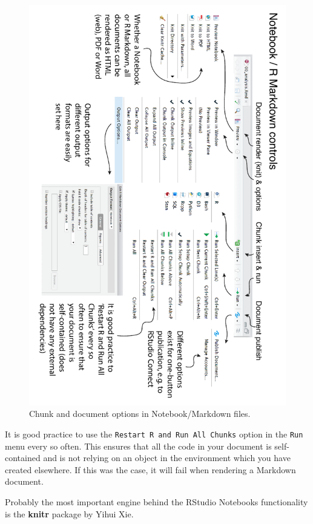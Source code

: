 \documentclass[
  12pt,
  krantz2]{krantz}
\begin{document}
\begin{figure}
\centering
\includegraphics{images/chapter12/4_notebook_options_rotated.pdf}
\caption{\label{fig:chap12-fig-options}Chunk and document options in Notebook/Markdown files.}
\end{figure}

It is good practice to use the \texttt{Restart\ R\ and\ Run\ All\ Chunks} option in the \texttt{Run} menu every so often.
This ensures that all the code in your document is self-contained and is not relying on an object in the environment which you have created elsewhere.
If this was the case, it will fail when rendering a Markdown document.

Probably the most important engine behind the RStudio Notebooks functionality is the \textbf{knitr} package by Yihui Xie.
\end{document}
